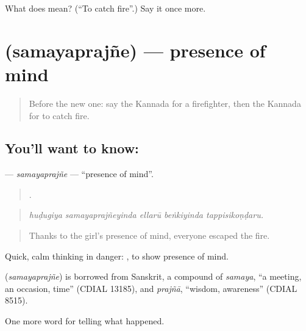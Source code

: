 \begin{tcolorbox}[breakable,colback=teal!4,colframe=teal!35!black,title={Before you move on}]
What does  mean? (\textquotedblleft{}To catch fire\textquotedblright{}.) Say it once more.
\end{tcolorbox}
\section[\texorpdfstring{\kn{ಸಮಯಪ್ರಜ್ಞೆ} (samayaprajñe)}{ಸಮಯಪ್ರಜ್ಞೆ (samayaprajñe)}]{ (samayaprajñe) — presence of mind}

\label{lesson:KA-C324-samayaprajne}



\begin{quote}
Before the new one: say the Kannada for a firefighter, then the Kannada for to catch fire.
\end{quote}

\subsection*{You'll want to know: }
\textbf{} — \emph{samayaprajñe} — \textquotedblleft{}presence of mind\textquotedblright{}.

\begin{quote}
    .
\end{quote}

\begin{quote}
\emph{huḍugiya samayaprajñeyinda ellarū beṅkiyinda tappisikoṇḍaru.}
\end{quote}

\begin{quote}
Thanks to the girl's presence of mind, everyone escaped the fire.
\end{quote}

Quick, calm thinking in danger:  , to show presence of mind.

\begin{cousinweb}
\textbf{} (\emph{samayaprajñe}) is borrowed from Sanskrit, a compound of \emph{samaya}, \textquotedblleft{}a meeting, an occasion, time\textquotedblright{} (CDIAL 13185), and \emph{prajñā}, \textquotedblleft{}wisdom, awareness\textquotedblright{} (CDIAL 8515).
\end{cousinweb}

\begin{grammarlens}[title={What you've built}]
One more word for telling what happened.
\end{grammarlens}

